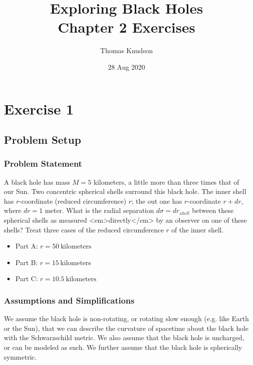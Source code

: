 \documentclass[]{report}
\title{Exploring Black Holes \\ \large Chapter 2 Exercises}
\author{Thomas Knudson}
\date{28 Aug 2020}
\begin{document}
  \maketitle

  \tableofcontents

  \chapter{Exercise 1}
    \section{Problem Setup}
      \subsection{Problem Statement}
        A black hole has mass $M = 5$ kilometers, a little more than three times that of our Sun. Two concentric spherical shells surround this black hole. The inner shell has $r$-coordinate (reduced circumference) $r$; the out one has $r$-coordinate $r+dr$, where $dr=1$ meter. What is the radial separation $d\sigma=dr_{shell}$ between these spherical shells as measured <em>directly</em> by an observer on one of these shells? Treat three cases of the reduced circumference $r$ of the inner shell.

        \begin{itemize}
          \item Part A: $r=50\ \text{kilometers}$
          \item Part B: $r=15\ \text{kilometers}$
          \item Part C: $r=10.5\ \text{kilometers}$
          \end{itemize}

      \subsection{Assumptions and Simplifications}
        We assume the black hole is non-rotating, or rotating slow enough (e.g. like Earth or the Sun), that we can describe the curvature of spacetime about the black hole with the Schwarzschild metric. We also assume that the black hole is uncharged, or can be modeled as such. We further assume that the black hole is spherically symmetric.
\end{document}
